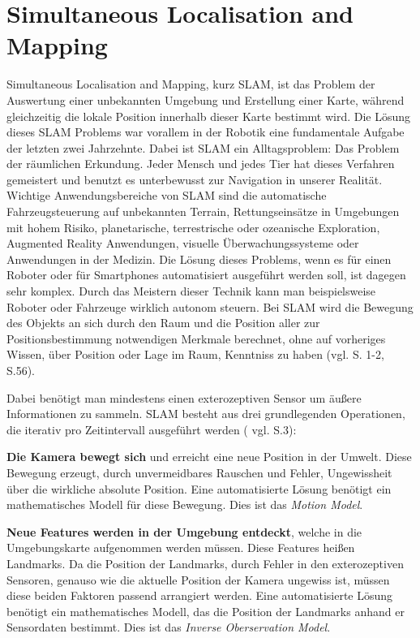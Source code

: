 \chapter{Simultaneous Localisation and Mapping}

Simultaneous Localisation and Mapping, kurz SLAM, ist das Problem der Auswertung einer unbekannten Umgebung und Erstellung einer Karte, während gleichzeitig die lokale Position innerhalb dieser Karte bestimmt wird. Die Lösung dieses SLAM Problems war vorallem in der Robotik eine fundamentale Aufgabe der letzten zwei Jahrzehnte. Dabei ist SLAM ein Alltagsproblem: Das Problem der räumlichen Erkundung. Jeder Mensch und jedes Tier hat dieses Verfahren gemeistert und benutzt es unterbewusst zur Navigation in unserer Realität. Wichtige Anwendungsbereiche von SLAM sind die automatische Fahrzeugsteuerung auf unbekannten Terrain, Rettungseinsätze in Umgebungen mit hohem Risiko, planetarische, terrestrische oder ozeanische Exploration, Augmented Reality Anwendungen, visuelle Überwachungssysteme oder Anwendungen in der Medizin.
Die Lösung dieses Problems, wenn es für einen Roboter oder für Smartphones automatisiert ausgeführt werden soll, ist dagegen sehr komplex. Durch das Meistern dieser Technik kann man beispielsweise Roboter oder Fahrzeuge wirklich autonom steuern. Bei SLAM wird die Bewegung des Objekts an sich durch den Raum und die Position aller zur Positionsbestimmung notwendigen Merkmale berechnet, ohne auf vorheriges Wissen, über Position oder Lage im Raum, Kenntniss zu haben (vgl. \cite{slam} S. 1-2, \cite{survey} S.56).

Dabei benötigt man mindestens einen exterozeptiven Sensor um äußere Informationen zu sammeln.
SLAM besteht aus drei grundlegenden Operationen, die iterativ pro Zeitintervall ausgeführt werden ( vgl. \cite{ekf_slam} S.3):

\textbf{Die Kamera bewegt sich} und erreicht eine neue Position in der Umwelt. Diese Bewegung erzeugt, durch unvermeidbares Rauschen und Fehler, Ungewissheit über die wirkliche absolute Position. Eine automatisierte Lösung benötigt ein mathematisches Modell für diese Bewegung. Dies ist das \glqq\textit{Motion Model}\grqq{}.

\textbf{Neue Features werden in der Umgebung entdeckt}, welche in die Umgebungskarte aufgenommen werden müssen. Diese Features heißen \glqq Landmarks\grqq{}. Da die Position der Landmarks, durch Fehler in den exterozeptiven Sensoren, genauso wie die aktuelle Position der Kamera ungewiss ist, müssen diese beiden Faktoren passend arrangiert werden. Eine automatisierte Lösung benötigt ein mathematisches Modell, das die Position der Landmarks anhand er Sensordaten bestimmt. Dies ist das \glqq{}\textit{Inverse Oberservation Model}\grqq{}.

